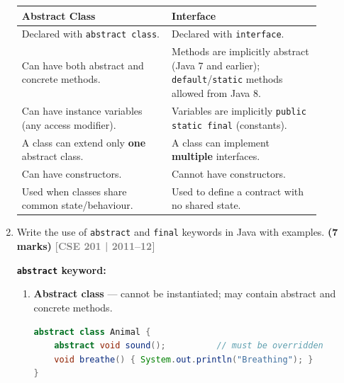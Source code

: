 \documentclass[12pt,a3paper]{article}
\newcommand{\yr}[1]{\hfill\textcolor{gray}{\small\textbf{[#1]}}}
\newcommand{\mk}[1]{\textcolor{orange!70!black}{\small\textbf{(#1 marks)}}}
\begin{document}
\begin{enumerate}
\begin{tcolorbox}[enhanced,breakable,ansbox,
  colback=cD!4,colframe=cD,boxrule=0.8pt,arc=5pt,
  title={\textbf{Answer --- Abstract Class vs.\ Interface}},
  fonttitle=\bfseries\color{white},colbacktitle=cD]
\begin{center}
\small
\begin{tabular}{@{}p{0.44\linewidth}p{0.44\linewidth}@{}}
\toprule
\textbf{Abstract Class} & \textbf{Interface} \\
\midrule
Declared with \texttt{abstract class}. &
Declared with \texttt{interface}. \\[4pt]
Can have both abstract and concrete methods. &
Methods are implicitly abstract (Java 7 and earlier);
\texttt{default}/\texttt{static} methods allowed from Java 8. \\[4pt]
Can have instance variables (any access modifier). &
Variables are implicitly \texttt{public static final} (constants). \\[4pt]
A class can extend only \textbf{one} abstract class. &
A class can implement \textbf{multiple} interfaces. \\[4pt]
Can have constructors. &
Cannot have constructors. \\[4pt]
Used when classes share common state/behaviour. &
Used to define a contract with no shared state. \\
\bottomrule
\end{tabular}
\end{center}

\end{tcolorbox}

\item Write the use of \texttt{abstract} and \texttt{final} keywords in Java with examples. \mk{7}
\yr{CSE 201 | 2011--12}

\begin{tcolorbox}[enhanced,breakable,ansbox,
  colback=cD!4,colframe=cD,boxrule=0.8pt,arc=5pt,
  title={\textbf{Answer --- \texttt{abstract} and \texttt{final} Keywords in Java}},
  fonttitle=\bfseries\color{white},colbacktitle=cD]

\textbf{\texttt{abstract} keyword:}

\begin{enumerate}[label=\textbf{\arabic*.}]
  \item \textbf{Abstract class} --- cannot be instantiated; may contain
    abstract and concrete methods.
\begin{lstlisting}[language=Java]
abstract class Animal {
    abstract void sound();          // must be overridden
    void breathe() { System.out.println("Breathing"); }
}
\end{lstlisting}


\end{enumerate}
\end{tcolorbox}
\end{enumerate}
\end{document}
